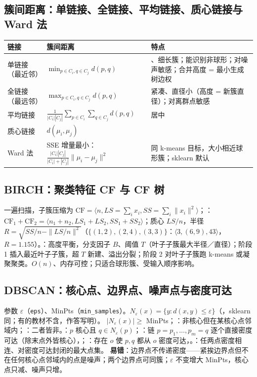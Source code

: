 \subsection{簇间距离：单链接、全链接、平均链接、质心链接与 Ward 法}
\begin{center}\small
\begin{tabularx}{\linewidth}{@{}p{2.4cm}p{5.6cm}L@{}}
\toprule
链接 & 簇间距离 & 特点\\
\midrule
单链接（最近邻）& $\min_{p\in C_i,q\in C_j}d(p,q)$ & 、细长簇；能识别非球形；对噪声敏感；合并高度 = 最小生成树边权\\
全链接（最远邻）& $\max_{p\in C_i,q\in C_j}d(p,q)$ & 紧凑、直径小（高度 = 新簇直径）；对离群点敏感\\
平均链接 & $\frac1{|C_i||C_j|}\sum_{p\in C_i}\sum_{q\in C_j}d(p,q)$ & 居中\\
质心链接 & $d(\mu_i,\mu_j)$ & \\
Ward 法 & SSE 增量最小：$\frac{|C_i||C_j|}{|C_i|+|C_j|}\|\mu_i-\mu_j\|^2$ & 同 k-means 目标，大小相近球形簇；sklearn 默认\\
\bottomrule
\end{tabularx}
\end{center}

\subsection{BIRCH：聚类特征 CF 与 CF 树}
一遍扫描，子簇压缩为 $\mathrm{CF}=\langle n,LS=\sum_ix_i,SS=\sum_i\|x_i\|^2\rangle$；：$\mathrm{CF}_1+\mathrm{CF}_2=\langle n_1+n_2,LS_1+LS_2,SS_1+SS_2\rangle$；质心 $LS/n$，半径 $R=\sqrt{SS/n-\|LS/n\|^2}$（$\{(1,2),(2,4),(3,3)\}$：$\langle3,(6,9),43\rangle$，$R=1.155$）。：高度平衡，分支因子 $B$、阈值 $T$（叶子子簇最大半径／直径）；阶段 1 插入最近叶子子簇，超 $T$ 新建、溢出分裂；阶段 2 对叶子子簇跑 k-means 或凝聚聚类。$O(n)$、内存可控；只适合球形簇、受输入顺序影响。

\subsection{DBSCAN：核心点、边界点、噪声点与密度可达}
参数 $\varepsilon$（\texttt{eps}）、MinPts（\texttt{min\_samples}）。$N_\varepsilon(x)=\{y:d(x,y)\le\varepsilon\}$（，sklearn 同；有的教材不含，作答写明）。 $|N_\varepsilon(x)|\ge$ MinPts；：非核心但在某核心点邻域内；：二者皆非。：$p$ 核心且 $q\in N_\varepsilon(p)$；：链 $p=p_1,\dots,p_m=q$ 逐个直接密度可达（除末点外皆核心），；：存在 $o$ 使 $p,q$ 都从 $o$ 密度可达，。：任两点密度相连、对密度可达封闭的最大点集。
\textbf{易错}：边界点不传递密度——紧挨边界点但不在任何核心点邻域内的点是噪声；两个边界点可同簇；$\varepsilon$ 不变增大 MinPts，核心点只减、噪声只增。

